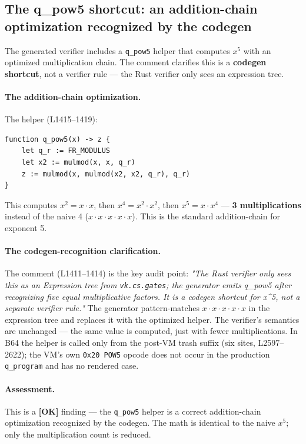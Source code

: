 \subsection{The q\_pow5 shortcut: an addition-chain optimization recognized by the codegen}
\label{sec:pr-pow5}

The generated verifier includes a \texttt{q\_pow5} helper that
computes $x^5$ with an optimized multiplication chain. The
comment clarifies this is a \textbf{codegen shortcut}, not a
verifier rule --- the Rust verifier only sees an expression tree.

\paragraph{The addition-chain optimization.} The helper (L1415--1419):
\begin{lstlisting}[style=yul]
function q_pow5(x) -> z {
    let q_r := FR_MODULUS
    let x2 := mulmod(x, x, q_r)
    z := mulmod(x, mulmod(x2, x2, q_r), q_r)
}
\end{lstlisting}
This computes $x^2 = x \cdot x$, then $x^4 = x^2 \cdot x^2$,
then $x^5 = x \cdot x^4$ --- \textbf{3 multiplications} instead
of the naive 4 ($x \cdot x \cdot x \cdot x \cdot x$). This is
the standard addition-chain for exponent 5.

\paragraph{The codegen-recognition clarification.} The comment
(L1411--1414) is the key audit point: \emph{"The Rust verifier
only sees this as an Expression tree from
\texttt{vk.cs.gates}; the generator emits q\_pow5 after
recognizing five equal multiplicative factors. It is a codegen
shortcut for x\^{}5, not a separate verifier rule."} The
generator pattern-matches $x \cdot x \cdot x \cdot x \cdot x$ in
the expression tree and replaces it with the optimized helper.
The verifier's semantics are unchanged --- the same value is
computed, just with fewer multiplications. In B64 the helper is
called only from the post-VM trash suffix (six sites,
L2597--2622); the VM's own \texttt{0x20 POW5} opcode does not
occur in the production \texttt{q\_program} and has no rendered
case.

\paragraph{Assessment.} This is a
\textcolor{tracegreen}{\textbf{[OK]}} finding --- the
\texttt{q\_pow5} helper is a correct addition-chain optimization
recognized by the codegen. The math is identical to the naive
$x^5$; only the multiplication count is reduced.

